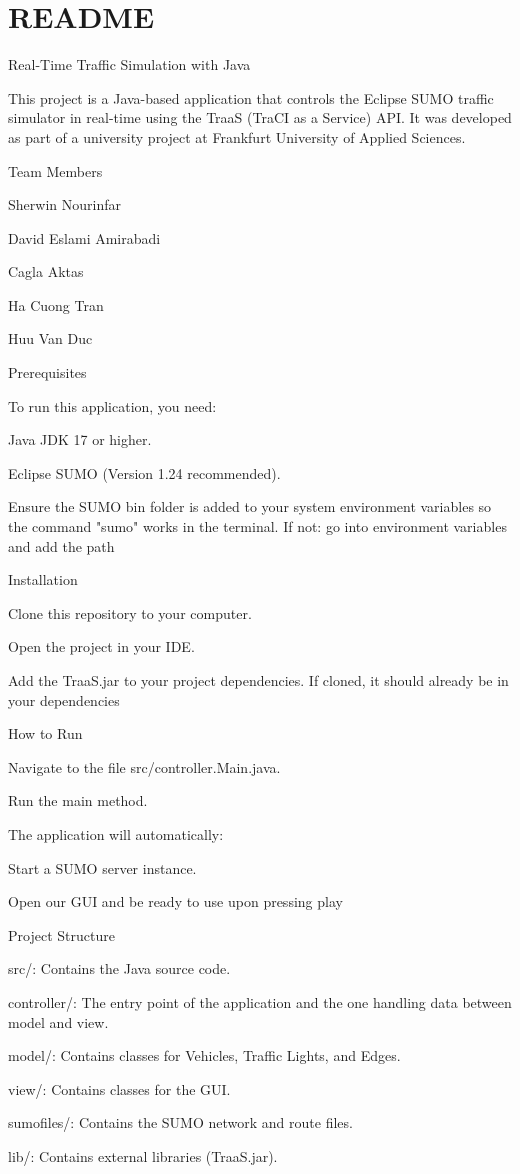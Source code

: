 \chapter{README }
\hypertarget{md__r_e_a_d_m_e}{}\label{md__r_e_a_d_m_e}
Real-\/\+Time Traffic Simulation with Java

This project is a Java-\/based application that controls the Eclipse SUMO traffic simulator in real-\/time using the TraaS (Tra\+CI as a Service) API. It was developed as part of a university project at Frankfurt University of Applied Sciences.

Team Members \begin{DoxyVerb}Sherwin Nourinfar

David Eslami Amirabadi

Cagla Aktas

Ha Cuong Tran

Huu Van Duc
\end{DoxyVerb}
 Prerequisites

To run this application, you need:\+ \begin{DoxyVerb}Java JDK 17 or higher.

Eclipse SUMO (Version 1.24 recommended).

    Ensure the SUMO bin folder is added to your system environment variables so the command "sumo" works in the terminal.
    If not: go into environment variables and add the path
\end{DoxyVerb}
 Installation \begin{DoxyVerb}Clone this repository to your computer.

Open the project in your IDE.

Add the TraaS.jar to your project dependencies.
If cloned, it should already be in your dependencies
\end{DoxyVerb}
 How to Run \begin{DoxyVerb}Navigate to the file src/controller.Main.java.

Run the main method.

The application will automatically:

    Start a SUMO server instance.

    Open our GUI and be ready to use upon pressing play
\end{DoxyVerb}
 Project Structure \begin{DoxyVerb}src/: Contains the Java source code.

    controller/: The entry point of the application and the one handling data between model and view.

    model/: Contains classes for Vehicles, Traffic Lights, and Edges.

    view/: Contains classes for the GUI.

sumofiles/: Contains the SUMO network and route files.

lib/: Contains external libraries (TraaS.jar).
\end{DoxyVerb}
 